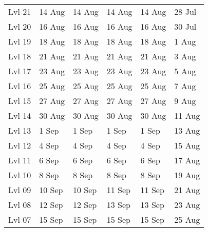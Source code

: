 \begin{table}[htbp]
\begin{tabular}{llllll}
Lvl 21  & 14 Aug   &14 Aug  & 14 Aug        &14 Aug         &28 Jul\\
Lvl 20  & 16 Aug   &16 Aug          &16 Aug         &16 Aug         &30 Jul\\
Lvl 19  & 18 Aug   &18 Aug           &18 Aug         &18 Aug         &1 Aug\\
Lvl 18  & 21 Aug   &21 Aug & 21 Aug                  &21 Aug         &3 Aug\\
Lvl 17  & 23 Aug   &23 Aug  &23 Aug         &23 Aug         &5 Aug\\
Lvl 16  & 25 Aug   &25 Aug  &25 Aug         &25 Aug         &7 Aug\\
Lvl 15  & 27 Aug   &27 Aug  &27 Aug         &27 Aug         &9 Aug\\
Lvl 14  & 30 Aug   &30 Aug  &30 Aug         &30 Aug         &11 Aug\\
Lvl 13  & 1 Sep     &1 Sep    &1 Sep         &1 Sep         &13 Aug\\
Lvl 12  & 4 Sep     &4 Sep    & 4 Sep        &4 Sep         &15 Aug\\
Lvl 11  & 6 Sep     &6 Sep    & 6 Sep        &6 Sep         &17 Aug\\
Lvl 10  & 8 Sep     &8 Sep    & 8 Sep        &8 Sep         &19 Aug\\
Lvl 09  & 10 Sep   &10 Sep   & 11 Sep        &11 Sep         &21 Aug\\
Lvl 08  & 12 Sep   &12 Sep   & 13 Sep        &13 Sep         &23 Aug\\
Lvl 07  & 15 Sep   &15 Sep   & 15 Sep        &15 Sep         &25 Aug\\
\bottomrule
\end{tabular}
\normalsize
\end{table}




















